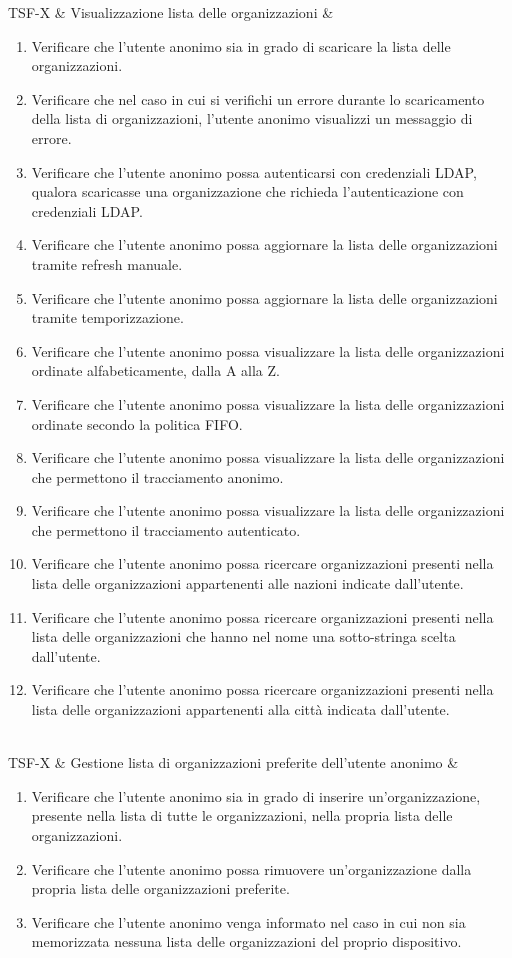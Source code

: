 
TSF-X & Visualizzazione lista delle organizzazioni & \begin{enumerate}
\item Verificare che l'utente anonimo sia in grado di scaricare la lista delle organizzazioni.
\item Verificare che nel caso in cui si verifichi un errore durante lo scaricamento della lista di organizzazioni, l'utente anonimo visualizzi un messaggio di errore.
\item Verificare che l'utente anonimo possa autenticarsi con credenziali LDAP, qualora scaricasse una organizzazione che richieda l'autenticazione con credenziali LDAP.
\item Verificare che l'utente anonimo possa aggiornare la lista delle organizzazioni tramite refresh manuale.
\item Verificare che l'utente anonimo possa aggiornare la lista delle organizzazioni tramite temporizzazione.
\item Verificare che l'utente anonimo possa visualizzare la lista delle organizzazioni ordinate alfabeticamente, dalla A alla Z.
\item Verificare che l'utente anonimo possa visualizzare la lista delle organizzazioni ordinate secondo la politica FIFO.
\item Verificare che l'utente anonimo possa visualizzare la lista delle organizzazioni che permettono il tracciamento anonimo.
\item Verificare che l'utente anonimo possa visualizzare la lista delle organizzazioni che permettono il tracciamento autenticato.
\item Verificare che l'utente anonimo possa ricercare organizzazioni presenti nella lista delle organizzazioni appartenenti alle nazioni indicate dall'utente.
\item  Verificare che l'utente anonimo possa ricercare organizzazioni presenti nella lista delle organizzazioni che hanno nel nome una sotto-stringa scelta dall'utente.
\item  Verificare che l'utente anonimo possa ricercare organizzazioni presenti nella lista delle organizzazioni appartenenti alla città indicata dall'utente.
\end{enumerate} \\
TSF-X & Gestione lista di organizzazioni preferite dell'utente anonimo & \begin{enumerate}
\item Verificare che l'utente anonimo sia in grado di inserire un'organizzazione, presente nella lista di tutte le organizzazioni,  nella propria lista delle organizzazioni.
\item Verificare che l'utente anonimo possa rimuovere un'organizzazione dalla propria lista delle organizzazioni preferite.
\item Verificare che l'utente anonimo venga informato nel caso in cui non sia memorizzata nessuna lista delle organizzazioni del proprio dispositivo.
\end{enumerate} \\
